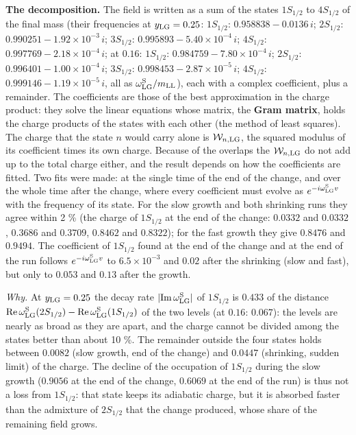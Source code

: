 \documentclass[
  10pt,
]{article}
\begin{document}
\textbf{The decomposition.} The field is written as a sum of the states
\(1S_{1/2}\) to \(4S_{1/2}\) of the final mass (their frequencies at
\(y_{\rm LG}=0.25\): \(1S_{1/2}\): \(0.958838-0.0136\,i\); \(2S_{1/2}\):
\(0.990251-1.92\times10^{-3}\,i\); \(3S_{1/2}\):
\(0.995893-5.40\times10^{-4}\,i\); \(4S_{1/2}\):
\(0.997769-2.18\times10^{-4}\,i\); at \(0.16\): \(1S_{1/2}\):
\(0.984759-7.80\times10^{-4}\,i\); \(2S_{1/2}\):
\(0.996401-1.00\times10^{-4}\,i\); \(3S_{1/2}\):
\(0.998453-2.87\times10^{-5}\,i\); \(4S_{1/2}\):
\(0.999146-1.19\times10^{-5}\,i\), all as
\(\omega^{\rm S}_{\rm LG}/m_{\rm LL}\)), each with a complex
coefficient, plus a remainder. The coefficients are those of the best
approximation in the charge product: they solve the linear equations
whose matrix, the \textbf{Gram matrix}, holds the charge products of the
states with each other (the method of least squares). The charge that
the state \(n\) would carry alone is \(\mathcal W_{n,{\rm LG}}\), the
squared modulus of its coefficient times its own charge. Because of the
overlaps the \(\mathcal W_{n,{\rm LG}}\) do not add up to the total
charge either, and the result depends on how the coefficients are
fitted. Two fits were made: at the single time of the end of the change,
and over the whole time after the change, where every coefficient must
evolve as \(e^{-i\omega^{\rm S}_{\rm LG}v}\) with the frequency of its
state. For the slow growth and both shrinking runs they agree within 2
\% (the charge of \(1S_{1/2}\) at the end of the change: \(0.0332\) and
\(0.0332\), \(0.3686\) and \(0.3709\), \(0.8462\) and \(0.8322\)); for
the fast growth they give \(0.8476\) and \(0.9494\). The coefficient of
\(1S_{1/2}\) found at the end of the change and at the end of the run
follows \(e^{-i\omega^{\rm S}_{\rm LG}v}\) to \(6.5\times10^{-3}\) and
\(0.02\) after the shrinking (slow and fast), but only to \(0.053\) and
\(0.13\) after the growth.

\emph{Why.} At \(y_{\rm LG}=0.25\) the decay rate
\(\lvert{\rm Im}\,\omega^{\rm S}_{\rm LG}\rvert\) of \(1S_{1/2}\) is
\(0.433\) of the distance
\({\rm Re}\,\omega^{\rm S}_{\rm LG}(2S_{1/2})-{\rm Re}\,\omega^{\rm S}_{\rm LG}(1S_{1/2})\)
of the two levels (at \(0.16\): \(0.067\)): the levels are nearly as
broad as they are apart, and the charge cannot be divided among the
states better than about 10 \%. The remainder outside the four states
holds between \(0.0082\) (slow growth, end of the change) and \(0.0447\)
(shrinking, sudden limit) of the charge. The decline of the occupation
of \(1S_{1/2}\) during the slow growth (\(0.9056\) at the end of the
change, \(0.6069\) at the end of the run) is thus not a loss from
\(1S_{1/2}\): that state keeps its adiabatic charge, but it is absorbed
faster than the admixture of \(2S_{1/2}\) that the change produced,
whose share of the remaining field grows.
\end{document}
